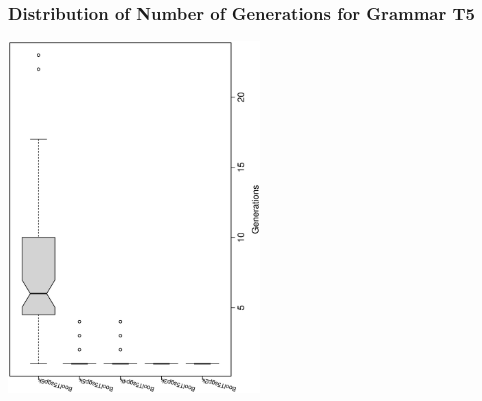  \begin{frame}
 \frametitle{ Distribution of Number of Generations for Grammar T5 }
 \begin{center}
\includegraphics[width=0.5\textwidth, angle=-90]
{ExpEboxplottGenerations006.eps}
 \end{center}
 \label{ExpEboxplottGenerations006.eps}  
 \end{frame}

